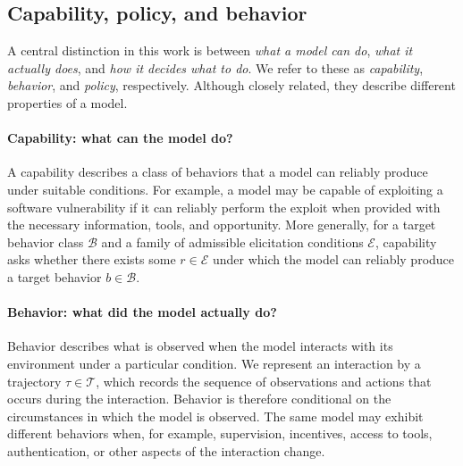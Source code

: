 \documentclass{article}
\newcommand{\Traj}{\mathcal{T}}
\begin{document}
\subsection{Capability, policy, and behavior}

A central distinction in this work is between \emph{what a model can do}, \emph{what it actually does}, and \emph{how it decides what to do}. We refer to these as \emph{capability}, \emph{behavior}, and \emph{policy}, respectively. Although closely related, they describe different properties of a model.

\paragraph{Capability: what can the model do?}
A capability describes a class of behaviors that a model can reliably produce under suitable conditions. For example, a model may be capable of exploiting a software vulnerability if it can reliably perform the exploit when provided with the necessary information, tools, and opportunity. More generally, for a target behavior class $\mathcal{B}$ and a family of admissible elicitation conditions $\mathcal{E}$, capability asks whether there exists some $r\in\mathcal{E}$ under which the model can reliably produce a target behavior $b\in\mathcal{B}$.

\paragraph{Behavior: what did the model actually do?}
Behavior describes what is observed when the model interacts with its environment under a particular condition. We represent an interaction by a trajectory $\tau\in\Traj$, which records the sequence of observations and actions that occurs during the interaction.
Behavior is therefore conditional on the circumstances in which the model is observed. The same model may exhibit different behaviors when, for example, supervision, incentives, access to tools, authentication, or other aspects of the interaction change.
\end{document}
